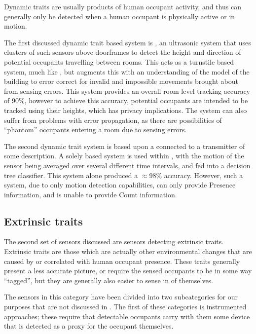 \documentclass[../thesis/thesis.tex]{subfiles}
\begin{document}
Dynamic traits are usually products of human occupant activity, and thus can generally only be detected when a human occupant is physically active or in motion.

The first discussed dynamic trait based system is \cite{hnat2012doorjamb}, an ultrasonic system that uses clusters of such sensors above doorframes to detect the height and direction of potential occupants travelling between rooms. This acts as a turnstile based system, much like \cite{erickson2013poem}, but augments this with an understanding of the model of the building to error correct for invalid and impossible movements brought about from sensing errors. This system provides an overall room-level tracking accuracy of 90\%, however to achieve this accuracy, potential occupants are intended to be tracked using their heights, which has privacy implications. The system can also suffer from problems with error propagation, as there are possibilities of ``phantom'' occupants entering a room due to sensing errors.

The second dynamic trait system is based upon a \pir connected to a transmitter of some description. A solely \pir based system is used within \cite{hailemariam2011real}, with the motion of the sensor being averaged over several different time intervals, and fed into a decision tree classifier. This \pir system alone produced a $\approx98\%$ accuracy. However, such a system, due to only motion detection capabilities, can only provide Presence information, and is unable to provide Count information.

\subsection{Extrinsic traits}
\label{subsec:litreview:sensors:extrinsic}
The second set of sensors discussed are sensors detecting extrinsic traits. Extrinsic traits are those which are actually other environmental changes that are caused by or correlated with human occupant presence. These traits generally present a less accurate picture, or require the sensed occupants to be in some way ``tagged'', but they are generally also easier to sense in of themselves.

The sensors in this category have been divided into two subcategories for our purposes that are not discussed in \cite{teixeira2010survey}. The first of these categories is instrumented approaches; these require that detectable occupants carry with them some device that is detected as a proxy for the occupant themselves.
\end{document}
